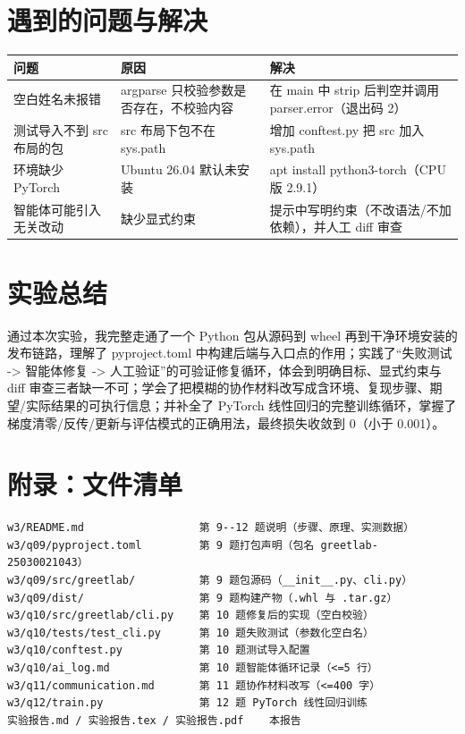 \documentclass[UTF8,fontset=ubuntu]{ctexart}
\begin{document}
\section{遇到的问题与解决}
\begin{center}
\begin{tabular}{@{}p{5cm}p{5.2cm}p{5cm}@{}}
\toprule
问题 & 原因 & 解决 \\
\midrule
空白姓名未报错 & argparse 只校验参数是否存在，不校验内容 & 在 main 中 strip 后判空并调用 parser.error（退出码 2） \\
测试导入不到 src 布局的包 & src 布局下包不在 sys.path & 增加 conftest.py 把 src 加入 sys.path \\
环境缺少 PyTorch & Ubuntu 26.04 默认未安装 & apt install python3-torch（CPU 版 2.9.1） \\
智能体可能引入无关改动 & 缺少显式约束 & 提示中写明约束（不改语法/不加依赖），并人工 diff 审查 \\
\bottomrule
\end{tabular}
\end{center}

\section{实验总结}
通过本次实验，我完整走通了一个 Python 包从源码到 wheel 再到干净环境安装的发布链路，理解了 pyproject.toml 中构建后端与入口点的作用；实践了“失败测试 -> 智能体修复 -> 人工验证”的可验证修复循环，体会到明确目标、显式约束与 diff 审查三者缺一不可；学会了把模糊的协作材料改写成含环境、复现步骤、期望/实际结果的可执行信息；并补全了 PyTorch 线性回归的完整训练循环，掌握了梯度清零/反传/更新与评估模式的正确用法，最终损失收敛到 0（小于 0.001）。

\section*{附录：文件清单}
\begin{lstlisting}
w3/README.md                  第 9--12 题说明（步骤、原理、实测数据）
w3/q09/pyproject.toml         第 9 题打包声明（包名 greetlab-25030021043）
w3/q09/src/greetlab/          第 9 题包源码（__init__.py、cli.py）
w3/q09/dist/                  第 9 题构建产物（.whl 与 .tar.gz）
w3/q10/src/greetlab/cli.py    第 10 题修复后的实现（空白校验）
w3/q10/tests/test_cli.py      第 10 题失败测试（参数化空白名）
w3/q10/conftest.py            第 10 题测试导入配置
w3/q10/ai_log.md              第 10 题智能体循环记录（<=5 行）
w3/q11/communication.md       第 11 题协作材料改写（<=400 字）
w3/q12/train.py               第 12 题 PyTorch 线性回归训练
实验报告.md / 实验报告.tex / 实验报告.pdf    本报告
\end{lstlisting}
\end{document}
